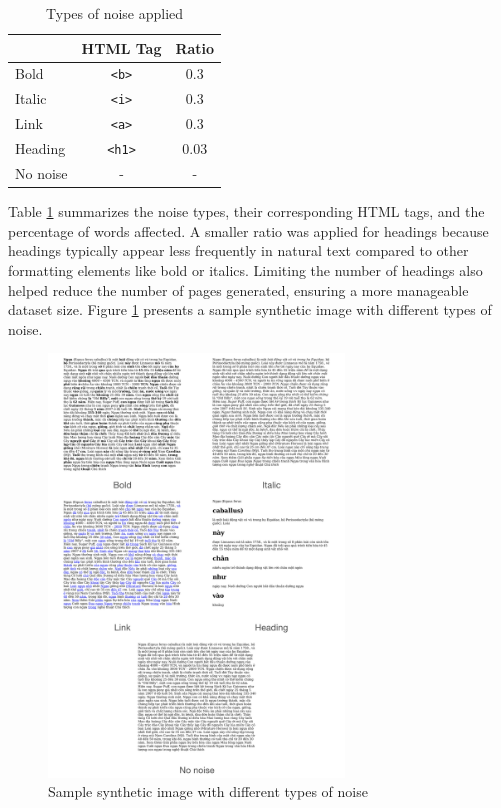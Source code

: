 \documentclass[12pt,oneside]{memoir}
\begin{document}
\begin{table}[ht]
    \centering
    \caption{Types of noise applied}
    \label{table:noises}
    \begin{tabular}{lcc}
        \toprule
        & HTML Tag & Ratio\\
        \midrule
        Bold & \texttt{<b>} & 0.3\\
        Italic & \texttt{<i>} & 0.3\\
        Link & \texttt{<a>} & 0.3\\
        Heading & \texttt{<h1>} & 0.03\\
        No noise & - & -\\
        \bottomrule
    \end{tabular}
\end{table}

Table \ref{table:noises} summarizes the noise types, their corresponding HTML tags, and the percentage of words affected.
A smaller ratio was applied for headings because headings typically appear less frequently in natural text compared to other formatting elements like bold or italics.
Limiting the number of headings also helped reduce the number of pages generated, ensuring a more manageable dataset size.
Figure \ref{figure:noises} presents a sample synthetic image with different types of noise.

\begin{figure}[ht]
    \centering
    \includegraphics[width=0.7\textwidth]{images/noises.png}
    \caption{Sample synthetic image with different types of noise}
    \label{figure:noises}
\end{figure}
\end{document}
